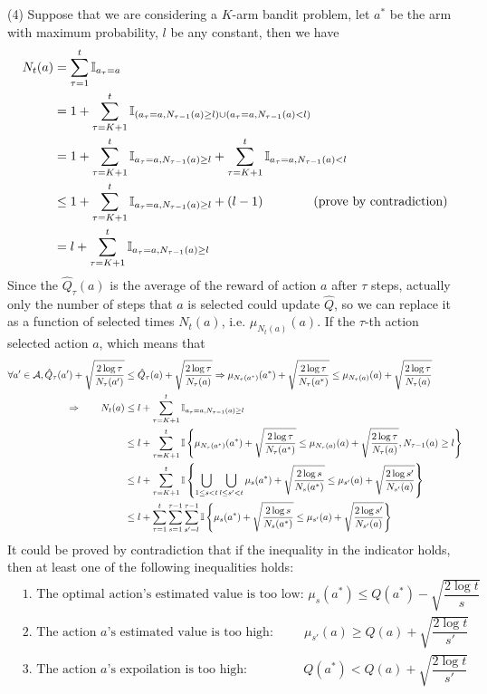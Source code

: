 (4) Suppose that we are considering a $K$-arm bandit problem, let $a^*$ be the arm with maximum probability, $l$ be any constant, then we have
\begin{align*}
N_t(a) &= \sum_{\tau=1}^{t}\mathbb{I}_{a_\tau=a} \\
&= 1 + \sum_{\tau=K+1}^{t}\mathbb{I}_{(a_\tau=a,N_{\tau-1}(a)\geq l)\cup(a_\tau=a,N_{\tau-1}(a)< l)} \\
&= 1 + \sum_{\tau=K+1}^{t}\mathbb{I}_{a_\tau=a,N_{\tau-1}(a)\geq l} + \sum_{\tau=K+1}^{t}\mathbb{I}_{a_\tau=a,N_{\tau-1}(a)< l} \\
&\leq 1 + \sum_{\tau=K+1}^{t}\mathbb{I}_{a_\tau=a,N_{\tau-1}(a)\geq l} + (l - 1) \qquad\qquad\text{(prove by contradiction)} \\
&= l + \sum_{\tau=K+1}^{t}\mathbb{I}_{a_\tau=a,N_{\tau-1}(a)\geq l}
\end{align*}
Since the $\hat{Q}_{\tau}(a)$ is the average of the reward of action $a$ after $\tau$ steps, actually only the number of steps that $a$ is selected could update $\hat{Q}$, so we can replace it as a function of selected times $N_t(a)$, i.e. $\mu_{N_t(a)}(a)$. If the $\tau$-th action selected action $a$, which means that
\begin{align*}
\forall a'\in\mathcal{A}, \hat{Q}_{\tau}(a')+\sqrt{\dfrac{2\log\tau}{N_{\tau}(a')}} &\leq \hat{Q}_{\tau}(a)+\sqrt{\dfrac{2\log\tau}{N_{\tau}(a)}} \Rightarrow \mu_{N_{\tau}(a^*)}(a^*)+\sqrt{\dfrac{2\log\tau}{N_{\tau}(a^*)}}\leq \mu_{N_{\tau}(a)}(a)+\sqrt{\dfrac{2\log\tau}{N_{\tau}(a)}} \\
\Rightarrow\qquad N_t(a) &\leq l + \sum_{\tau=K+1}^{t}\mathbb{I}_{a_\tau=a,N_{\tau-1}(a)\geq l} \\
&\leq l + \sum_{\tau=K+1}^{t}\mathbb{I}\left\{\mu_{N_{\tau}(a^*)}(a^*)+\sqrt{\frac{2\log\tau}{N_{\tau}(a^*)}}\leq \mu_{N_{\tau}(a)}(a)+\sqrt{\frac{2\log\tau}{N_{\tau}(a)}},N_{\tau-1}(a)\geq l\right\} \\
&\leq l + \sum_{\tau=K+1}^{t}\mathbb{I}\left\{\bigcup_{1\leq s< t}\bigcup_{l\leq s'< t}\mu_{s}(a^*)+\sqrt{\frac{2\log s}{N_{s}(a^*)}}\leq \mu_{s'}(a)+\sqrt{\frac{2\log s'}{N_{s'}(a)}}\right\} \\
&\leq l + \sum_{\tau=1}^{t}\sum_{s=1}^{\tau-1}\sum_{s'=l}^{\tau-1}\mathbb{I}\left\{\mu_{s}(a^*)+\sqrt{\frac{2\log s}{N_{s}(a^*)}}\leq \mu_{s'}(a)+\sqrt{\frac{2\log s'}{N_{s'}(a)}}\right\}
\end{align*}
It could be proved by contradiction that if the inequality in the indicator holds, then at least one of the following inequalities holds:
\begin{align*}
&\text{1. The optimal action's estimated value is too low: } \mu_s(a^*)\leq Q(a^*) - \sqrt{\dfrac{2\log t}{s}} \\
&\text{2. The action $a$'s estimated value is too high:}\qquad\ \ \mu_{s'}(a)\geq Q(a) + \sqrt{\dfrac{2\log t}{s'}} \\
&\text{3. The action $a$'s expoilation is too high:}\qquad\qquad\ \ Q(a^*)< Q(a) + \sqrt{\dfrac{2\log t}{s'}}
\end{align*}
